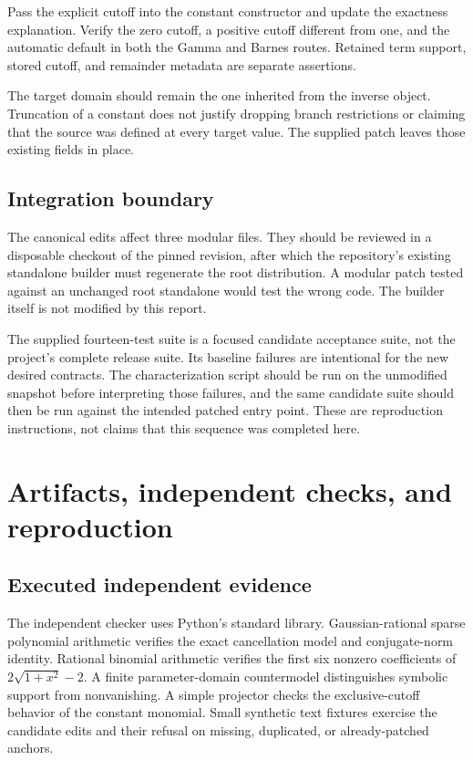 \documentclass[11pt,letterpaper]{article}
\begin{document}
Pass the explicit cutoff into the constant constructor and update the exactness explanation. Verify the zero cutoff, a positive cutoff different from one, and the automatic default in both the Gamma and Barnes routes. Retained term support, stored cutoff, and remainder metadata are separate assertions.

The target domain should remain the one inherited from the inverse object. Truncation of a constant does not justify dropping branch restrictions or claiming that the source was defined at every target value. The supplied patch leaves those existing fields in place.

\subsection{Integration boundary}

The canonical edits affect three modular files. They should be reviewed in a disposable checkout of the pinned revision, after which the repository's existing standalone builder must regenerate the root distribution. A modular patch tested against an unchanged root standalone would test the wrong code. The builder itself is not modified by this report.\cite{kernelreadme}

The supplied fourteen-test suite is a focused candidate acceptance suite, not the project's complete release suite. Its baseline failures are intentional for the new desired contracts. The characterization script should be run on the unmodified snapshot before interpreting those failures, and the same candidate suite should then be run against the intended patched entry point. These are reproduction instructions, not claims that this sequence was completed here.

\section{Artifacts, independent checks, and reproduction}\label{sec:reproduction}

\subsection{Executed independent evidence}

The independent checker uses Python's standard library. Gaussian-rational sparse polynomial arithmetic verifies the exact cancellation model and conjugate-norm identity. Rational binomial arithmetic verifies the first six nonzero coefficients of $2\sqrt{1+x^2}-2$. A finite parameter-domain countermodel distinguishes symbolic support from nonvanishing. A simple projector checks the exclusive-cutoff behavior of the constant monomial. Small synthetic text fixtures exercise the candidate edits and their refusal on missing, duplicated, or already-patched anchors.
\end{document}
